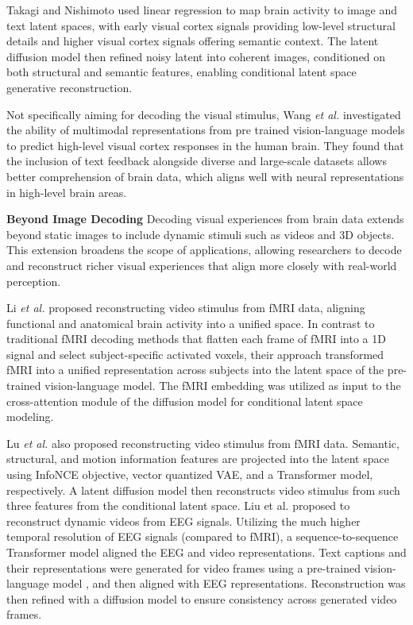 \documentclass[journal]{IEEEtran}
\begin{document}
Takagi and Nishimoto \cite{Takagi2023} used linear regression to map brain activity to image and text latent spaces, with early visual cortex signals providing low-level structural details and higher visual cortex signals offering semantic context. The latent diffusion model then refined noisy latent into coherent images, conditioned on both structural and semantic features, enabling conditional latent space generative reconstruction.

Not specifically aiming for decoding the visual stimulus, Wang \emph{et al.} \cite{Wang2023BrainBERT} investigated the ability of multimodal representations from pre trained vision-language models to predict high-level visual cortex responses in the human brain. They found that the inclusion of text feedback alongside diverse and large-scale datasets allows better comprehension of brain data, which aligns well with neural representations in high-level brain areas.

\textbf{Beyond Image Decoding} Decoding visual experiences from brain data extends beyond static images to include dynamic stimuli such as videos and 3D objects. This extension broadens the scope of applications, allowing researchers to decode and reconstruct richer visual experiences that align more closely with real-world perception.

Li \emph{et al.} \cite{Li2024c} proposed reconstructing video stimulus from fMRI data, aligning functional and anatomical brain activity into a unified space. In contrast to traditional fMRI decoding methods that flatten each frame of fMRI into a 1D signal and select subject-specific activated voxels, their approach transformed fMRI into a unified representation across subjects into the latent space of the pre-trained vision-language model. The fMRI embedding was utilized as input to the cross-attention module of the diffusion model for conditional latent space modeling.

Lu \emph{et al.} \cite{Lu2024} also proposed reconstructing video stimulus from fMRI data. Semantic, structural, and motion information features are projected into the latent space using InfoNCE objective, vector quantized VAE, and a Transformer model, respectively. A latent diffusion model then reconstructs video stimulus from such three features from the conditional latent space. Liu et al. \cite{Liu2024} proposed to reconstruct dynamic videos from EEG signals. Utilizing the much higher temporal resolution of EEG signals (compared to fMRI), a sequence-to-sequence Transformer model aligned the EEG and video representations. Text captions and their representations were generated for video frames using a pre-trained vision-language model \cite{Li2022BLIP, Radford2021}, and then aligned with EEG representations. Reconstruction was then refined with a diffusion model to ensure consistency across generated video frames.
\end{document}
